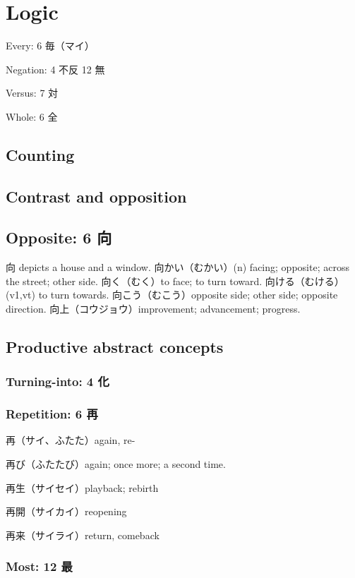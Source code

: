 \chapter{Logic}

Every: 6 毎（マイ）

Negation: 4 不反 12 無

Versus: 7 対

Whole: 6 全

\section{Counting}

\section{Contrast and opposition}

\section{Opposite: 6 向}

向 depicts a house and a window.
向かい（むかい）(n) facing; opposite; across the street; other side.
向く（むく）to face; to turn toward.
向ける（むける）(v1,vt) to turn towards.
向こう（むこう）opposite side; other side; opposite direction.
向上（コウジョウ）improvement; advancement; progress.

\section{Productive abstract concepts}

\subsection{Turning-into: 4 化}

\subsection{Repetition: 6 再}

再（サイ、ふたた）again, re-

再び（ふたたび）again; once more; a second time.

再生（サイセイ）playback; rebirth

再開（サイカイ）reopening

再来（サイライ）return, comeback

\subsection{Most: 12 最}

